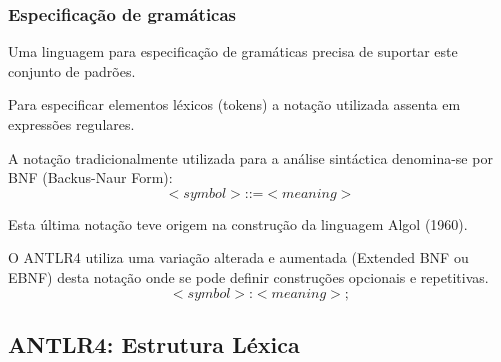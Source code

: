 \documentclass{article}
\begin{document}
\subsubsection{Especificação de gramáticas}

\begin{flushleft}
  \item Uma linguagem para especificação de gramáticas precisa
  de suportar este conjunto de padrões.
  \item Para especificar elementos léxicos (tokens) a notação
  utilizada assenta em expressões regulares.
  \item A notação tradicionalmente utilizada para a análise
  sintáctica denomina-se por BNF (Backus-Naur Form):
  \[<symbol> \textbf{::=} <meaning>\]
  \item Esta última notação teve origem na construção da
  linguagem Algol (1960).
  \item O ANTLR4 utiliza uma variação alterada e aumentada
  (Extended BNF ou EBNF) desta notação onde se pode
  definir construções opcionais e repetitivas.
  \[<symbol> \textbf{:} <meaning> ;\]
\end{flushleft}

\subsection{ANTLR4: Estrutura Léxica}
\end{document}
